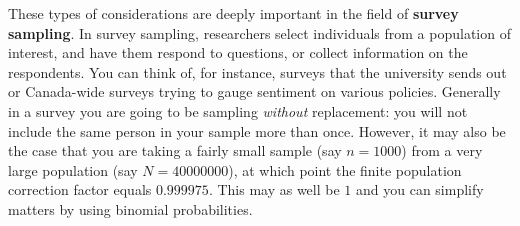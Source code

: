 \documentclass[
  letterpaper,
  DIV=11,
  numbers=noendperiod]{scrreprt}
\theoremstyle{definition}
\theoremstyle{definition}
\theoremstyle{definition}
\theoremstyle{remark}
\begin{document}
\begin{tcolorbox}
These types of considerations are deeply important in the field of
\textbf{survey sampling}. In survey sampling, researchers select
individuals from a population of interest, and have them respond to
questions, or collect information on the respondents. You can think of,
for instance, surveys that the university sends out or Canada-wide
surveys trying to gauge sentiment on various policies. Generally in a
survey you are going to be sampling \emph{without} replacement: you will
not include the same person in your sample more than once. However, it
may also be the case that you are taking a fairly small sample (say
\(n=1000\)) from a very large population (say \(N=40000000\)), at which
point the finite population correction factor equals \(0.999975\). This
may as well be \(1\) and you can simplify matters by using binomial
probabilities.

\end{tcolorbox}
\end{document}
